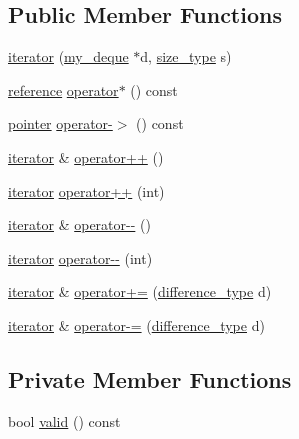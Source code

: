 \subsection*{Public Member Functions}
\begin{DoxyCompactItemize}
\item 
\hyperlink{classmy__deque_1_1iterator_a3f9e14fe295b2d79df0c1704f5fc51d1}{iterator} (\hyperlink{classmy__deque}{my\-\_\-deque} $\ast$d, \hyperlink{classmy__deque_a61e5e5317fe72a381ce4d45f09544b02}{size\-\_\-type} s)
\item 
\hyperlink{classmy__deque_1_1iterator_ae165ee997a9e18330c593789e9899e57}{reference} \hyperlink{classmy__deque_1_1iterator_a12632f02814bba64ca79f42edc0e1497}{operator$\ast$} () const 
\item 
\hyperlink{classmy__deque_1_1iterator_add0e1ed49072422b5aa0ef52303fb86e}{pointer} \hyperlink{classmy__deque_1_1iterator_a064f5b1faf5a72113083425133de9a41}{operator-\/$>$} () const 
\item 
\hyperlink{classmy__deque_1_1iterator}{iterator} \& \hyperlink{classmy__deque_1_1iterator_ab2a00619614e204eedb184112a56016e}{operator++} ()
\item 
\hyperlink{classmy__deque_1_1iterator}{iterator} \hyperlink{classmy__deque_1_1iterator_a57f6ac4aef7215ca67b6e05eeda29ee4}{operator++} (int)
\item 
\hyperlink{classmy__deque_1_1iterator}{iterator} \& \hyperlink{classmy__deque_1_1iterator_a278cab96c03498e55ba1aa4e05f1538e}{operator-\/-\/} ()
\item 
\hyperlink{classmy__deque_1_1iterator}{iterator} \hyperlink{classmy__deque_1_1iterator_a5bef4b6332aecf7dcda57cee9a1fdc70}{operator-\/-\/} (int)
\item 
\hyperlink{classmy__deque_1_1iterator}{iterator} \& \hyperlink{classmy__deque_1_1iterator_ad17b4f6e8be4d8242ad4572d62beff82}{operator+=} (\hyperlink{classmy__deque_1_1iterator_ac5f62e8566ad92478931c2abd9ac6596}{difference\-\_\-type} d)
\item 
\hyperlink{classmy__deque_1_1iterator}{iterator} \& \hyperlink{classmy__deque_1_1iterator_a13c056d48543734a23a9de09fd652868}{operator-\/=} (\hyperlink{classmy__deque_1_1iterator_ac5f62e8566ad92478931c2abd9ac6596}{difference\-\_\-type} d)
\end{DoxyCompactItemize}
\subsection*{Private Member Functions}
\begin{DoxyCompactItemize}
\item 
bool \hyperlink{classmy__deque_1_1iterator_a4e56b174bbf8c52c58e2f3934be7fc75}{valid} () const 
\end{DoxyCompactItemize}
